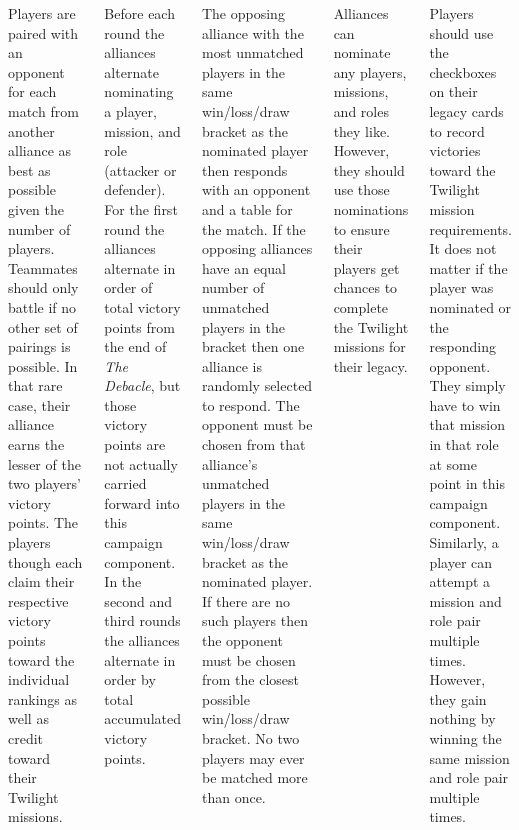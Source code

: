 \begin{columns}


Players are paired with an opponent for each match from another
alliance as best as possible given the number of players.  Teammates
should only battle if no other set of pairings is possible.  In that
rare case, their alliance earns the lesser of the two players' victory
points.  The players though each claim their respective victory points
toward the individual rankings as well as credit toward their Twilight
missions.

Before each round the alliances alternate nominating a player,
mission, and role (attacker or defender).  For the first round the
alliances alternate in order of total victory points from the end of
\emph{The Debacle}, but those victory points are not actually carried
forward into this campaign component.  In the second and third rounds
the alliances alternate in order by total accumulated victory points.

The opposing alliance with the most unmatched players in the same
win/loss/draw bracket as the nominated player then responds with an
opponent and a table for the match.  If the opposing alliances have an
equal number of unmatched players in the bracket then one alliance is
randomly selected to respond.  The opponent must be chosen from that
alliance's unmatched players in the same win/loss/draw bracket as the
nominated player.  If there are no such players then the opponent must
be chosen from the closest possible win/loss/draw bracket.  No two
players may ever be matched more than once.

Alliances can nominate any players, missions, and roles they like.
However, they should use those nominations to ensure their players get
chances to complete the Twilight missions for their legacy.

Players should use the checkboxes on their legacy cards to record
victories toward the Twilight mission requirements.  It does not
matter if the player was nominated or the responding opponent.  They
simply have to win that mission in that role at some point in this
campaign component.  Similarly, a player can attempt a mission and
role pair multiple times.  However, they gain nothing by winning the
same mission and role pair multiple times.

\end{columns}


\clearpage
{}


